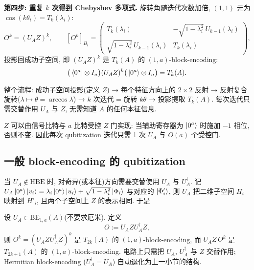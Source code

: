 \documentclass[utf8]{article} %
\numberwithin{equation}{section}   %
\newtheorem{Thm}{\hskip 2em {\color{blue} 定理}}[subsection]
\newtheorem{Note}{\hskip 2em {\color{red} 注}}[subsection]
\begin{document}
\textbf{第四步: 重复 $k$ 次得到 Chebyshev 多项式.} 旋转角随迭代次数加倍,
$(1,1)$ 元为 $\cos(k\theta_i) = T_k(\lambda_i)$:
\begin{equation}
    O^k = (U_A Z)^k, \qquad
    [O^k]_{B_i} = \begin{pmatrix} T_k(\lambda_i) & -\sqrt{1-\lambda_i^2}\,U_{k-1}(\lambda_i) \\
        \sqrt{1-\lambda_i^2}\,U_{k-1}(\lambda_i) & T_k(\lambda_i) \end{pmatrix},
\end{equation}
投影回成功子空间, 即 $(U_A Z)^k$ 是 $T_k(A)$ 的 $(1, a)$-block-encoding:
\begin{equation}
    \big(\bra{0^a}\otimes I_n\big) (U_A Z)^k \big(\ket{0^a}\otimes I_n\big) = T_k(A).
\end{equation}

\begin{Note}[流程小结]
    整个流程: 成功子空间投影(定义 $Z$) → 每个特征方向上的 $2\times2$ 反射 →
    反射复合旋转($\lambda \mapsto \theta = \arccos\lambda$) → $k$ 次迭代 = 旋转 $k\theta$ →
    投影提取 $T_k(A)$. 每次迭代只需交替作用 $U_A$ 与 $Z$, 无需知道 $A$ 的任何本征信息.
\end{Note}

\begin{Note}[$Z$ 的实现与电路]
    $Z$ 可以由信号比特与 $a$ 比特受控 $Z$ 门实现: 当辅助寄存器为 $\ket{0^a}$ 时施加 $-1$
    相位, 否则不变. 因此每次 qubitization 迭代只需 1 次 $U_A$ 与 $O(a)$ 个受控门.
\end{Note}

\subsection{一般 block-encoding 的 qubitization}

当 $U_A \notin \mathrm{HBE}$ 时, 对奇异(或本征)方向需要交替使用 $U_A$ 与 $U_A^\dagger$.
记 $U_A\ket{0^a}\ket{v_i} = \lambda_i\ket{0^a}\ket{u_i} + \sqrt{1-\lambda_i^2}\ket{\Phi_i}$
与对应的 $\ket{\Phi'_i}$, 则 $U_A$ 把二维子空间 $H_i$ 映射到 $H'_i$,
且两个子空间上 $Z$ 的表示相同. 于是

\begin{Thm}
    设 $U_A \in \mathrm{BE}_{1,a}(A)$(不要求厄米). 定义
    \begin{equation}
        O := U_A Z U_A^\dagger Z,
    \end{equation}
    则 $O^k = (U_A Z U_A^\dagger Z)^k$ 是 $T_{2k}(A)$ 的 $(1,a)$-block-encoding,
    而 $U_A Z\, O^k$ 是 $T_{2k+1}(A)$ 的 $(1,a)$-block-encoding.
    电路上只需把 $U_A$, $U_A^\dagger$ 与 $Z$ 交替作用; Hermitian block-encoding
    ($U_A^\dagger = U_A$) 自动退化为上一小节的结构.
\end{Thm}
\end{document}
